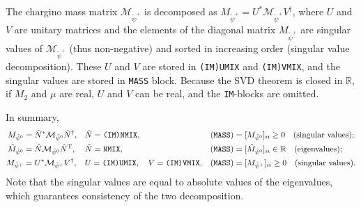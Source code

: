 \documentclass[CheatSheet]{subfiles}
\begin{document}
The chargino mass matrix $\mathcal M_{\tilde\psi^+}$ is decomposed as
$M_{\tilde\psi^+}=U^* \mathcal M_{\tilde\psi^+} V^\dagger$, where $U$ and $V$ are unitary matrices and the elements of the diagonal matrix $M_{\tilde\psi^+}$ are singular values of $\mathcal M_{\tilde\psi^+}$ (thus non-negative) and sorted in increasing order (singular value decomposition).
These $U$ and $V$ are stored in \texttt{(IM)UMIX} and \texttt{(IM)VMIX}, and the singular values are stored in \texttt{MASS} block.
Because the SVD theorem is closed in $\mathbb R$, if $M_2$ and $\mu$ are real, $U$ and $V$ can be real, and the \texttt{IM}-blocks are omitted.

In summary,
\begin{align}
      M_{\tilde\psi^0}&=\tilde N^* \mathcal M_{\tilde\psi^0}\tilde N^\dagger,
   && \tilde N=\texttt{(IM)NMIX},
   && \text{(\texttt{MASS})} = [M_{\tilde\psi^0}]_{ii} \ge 0 \quad\text{(singular values)};
\\
 \hat M_{\tilde\psi^0}&=\hat   N \mathcal M_{\tilde\psi^0}\hat N^{\mathrm{T}},
  && \hat N = \texttt{NMIX},
  &&  \text{(\texttt{MASS})} = [\hat M_{\tilde\psi^0}]_{ii}\in \mathbb R \quad\text{(eigenvalues)};
\\
      M_{\tilde\psi^+}&=U^* \mathcal M_{\tilde\psi^+} V^\dagger,
   && U=\texttt{(IM)UMIX},\quad V=\texttt{(IM)VMIX},
   && \text{(\texttt{MASS})} = [M_{\tilde\psi^+}]_{ii} \ge 0\quad\text{(singular values)}.
\end{align}
Note that the singular values are equal to absolute values of the eigenvalues, which guarantees consistency of the two decomposition.
\end{document}
